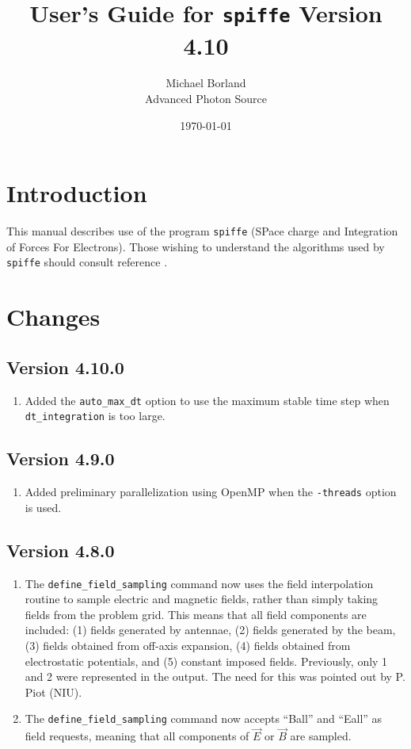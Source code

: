 \documentclass[11pt]{article}
\begin{document}
\title{User's Guide for {\tt spiffe} Version 4.10}
\author{Michael Borland\\Advanced Photon Source\\ \date{\today}}
\maketitle

\section{Introduction}

This manual describes use of the program {\tt spiffe} (SPace charge and
Integration of Forces For Electrons).  Those wishing to understand the
algorithms used by {\tt spiffe} should consult reference \cite{spiffeEqn}.

\section{Changes}
\subsection{Version 4.10.0}
\begin{enumerate}
\item Added the \verb|auto_max_dt| option to use the maximum stable time step when
  \verb|dt_integration| is too large.
\end{enumerate}

\subsection{Version 4.9.0}
\begin{enumerate}
\item Added preliminary parallelization using OpenMP when the \verb|-threads| option is used.
\end{enumerate}

\subsection{Version 4.8.0}

\begin{enumerate}
\item The \verb|define_field_sampling| command now uses the field interpolation routine to sample
  electric and magnetic fields, rather than simply taking fields from the problem grid. This means that
  all field components are included: (1) fields generated by antennae, (2) fields generated by the beam,
  (3) fields obtained from off-axis expansion, (4) fields obtained from electrostatic potentials, and (5) constant
  imposed fields. Previously, only 1 and 2 were represented in the output.
  The need for this was pointed out by P. Piot (NIU).
\item The \verb|define_field_sampling| command now accepts ``Ball'' and ``Eall'' as field requests, meaning
  that all components of $\vec{E}$ or $\vec{B}$ are sampled.
\end{enumerate}
\end{document}
